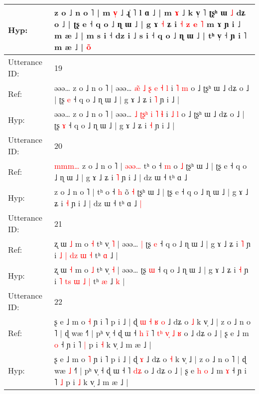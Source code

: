 \documentclass[10pt]{article}
\DeclareRobustCommand{\hl}[1]{{\textcolor{red}{#1}}}
\begin{document}
\begin{longtable}{ll}
 \\
Hyp: & z o ˩ n o ˥ | m \hl{v}\hl{̩} ˩ ɻ̍ ˥ l ɑ ˩ | m \hl{ɤ} ˩ k v̩ ˥\hl{}\hl{} ʈʂʰ ɯ \hl{˩} dʑ o ˩ | ʈʂ e ˧ q o ˩ ɳ ɯ ˩ | g ɤ \hl{˧} ʑ i\hl{}\hl{} \hl{˧} \hl{}\hl{z} \hl{e} \hl{˥} m ɤ\hl{}\hl{} ɲ i ˩ m æ ˩ | \hl{}\hl{}m\hl{} s i ˧ dz i ˩\hl{}\hl{} s i ˧ q o ˩ ɳ ɯ ˩ | tʰ v̩ ˧ ɲ i ˥ m æ ˩ | \hl{o}̃\hl{}\hl{}\hl{}\hl{}
 \\
\midrule
Utterance ID: & 19 \\
Ref: & əəə… z o ˩ n o ˥ | əəə… \hl{æ}\hl{̃} \hl{˩}\hl{ }\hl{ʂ} \hl{e} \hl{˧} \hl{l} i \hl{˥} \hl{m} o ˩ ʈʂʰ ɯ ˩ dʑ o ˩ | ʈʂ \hl{e} ˧ q o ˩ ɳ ɯ ˩ | g ɤ ˩ ʑ i \hl{˥} ɲ i ˩ |
 \\
Hyp: & əəə… z o ˩ n o ˥ | əəə… \hl{}\hl{˩} \hl{ʈ}\hl{ʂ}\hl{ʰ} \hl{i} \hl{˥} \hl{ɬ} i \hl{˩} \hl{l} o ˩ ʈʂʰ ɯ ˩ dʑ o ˩ | ʈʂ \hl{ɤ} ˧ q o ˩ ɳ ɯ ˩ | g ɤ ˩ ʑ i \hl{˧} ɲ i ˩ |
 \\
\midrule
Utterance ID: & 20 \\
Ref: & \hl{m}\hl{m}\hl{m}\hl{…}\hl{ }z o ˩ n o ˥ |\hl{ }\hl{ə}\hl{ə}\hl{ə}\hl{…} tʰ o ˧ \hl{m} o\hl{} \hl{˩} ʈʂʰ ɯ ˩ | ʈʂ e ˧ q o ˩ ɳ ɯ ˩ | g ɤ ˩ ʑ i \hl{˥} ɲ i ˩ | dz ɯ ˧ tʰ ɑ ˩\hl{}\hl{}
 \\
Hyp: & \hl{}\hl{}\hl{}\hl{}\hl{}z o ˩ n o ˥ |\hl{}\hl{}\hl{}\hl{}\hl{} tʰ o ˧ \hl{h} o\hl{̃} \hl{˧} ʈʂʰ ɯ ˩ | ʈʂ e ˧ q o ˩ ɳ ɯ ˩ | g ɤ ˩ ʑ i \hl{˧} ɲ i ˩ | dz ɯ ˧ tʰ ɑ ˩\hl{ }\hl{|}
 \\
\midrule
Utterance ID: & 21 \\
Ref: & ʐ ɯ \hl{˩} m o \hl{˧} tʰ v̩ \hl{˥} | əəə…\hl{ }\hl{|} ʈʂ \hl{e} ˧ q o ˩ ɳ ɯ ˩ | g ɤ ˩ ʑ i \hl{˥} ɲ i \hl{˩} \hl{|}\hl{ }\hl{d}\hl{z} \hl{ɯ} \hl{˧} tʰ \hl{ɑ} ˩\hl{}\hl{} |
 \\
Hyp: & ʐ ɯ \hl{˧} m o \hl{˩} tʰ v̩ \hl{˧} | əəə…\hl{}\hl{} ʈʂ \hl{ɯ} ˧ q o ˩ ɳ ɯ ˩ | g ɤ ˩ ʑ i \hl{˧} ɲ i \hl{˥} \hl{t}\hl{s}\hl{ }\hl{ɯ} \hl{˩} \hl{|} tʰ \hl{æ} ˩\hl{ }\hl{k} |
 \\
\midrule
Utterance ID: & 22 \\
Ref: & ʂ e ˩ m o \hl{˧} ɲ i ˥ p i ˩ | ɖ\hl{ }\hl{ɯ}\hl{ }\hl{˧}\hl{ }\hl{ʁ} \hl{o} ˩ dʑ o \hl{˩} k v̩ ˩ | z o ˩ n o ˥ | ɖ wæ\hl{}\hl{} ˧˥ | pʰ v̩ ˧ ɖ ɯ ˧\hl{ }\hl{h}\hl{ }\hl{i}\hl{̃} ˥\hl{ }\hl{t}\hl{ʰ}\hl{ }\hl{v}\hl{̩} \hl{˩}\hl{ }\hl{ʁ} o ˩ dʑ o ˩ | ʂ e\hl{}\hl{}\hl{}\hl{} ˩ m \hl{o} ˧ ɲ i ˥ \hl{|} p i \hl{˧} k v̩ ˩ m æ ˩ |
 \\
Hyp: & ʂ e ˩ m o \hl{˥} ɲ i ˥ p i ˩ | ɖ\hl{}\hl{}\hl{}\hl{}\hl{}\hl{} \hl{ɤ} ˩ dʑ o \hl{˧} k v̩ ˩ | z o ˩ n o ˥ | ɖ wæ\hl{ }\hl{˩} ˧˥ | pʰ v̩ ˧ ɖ ɯ ˧\hl{}\hl{}\hl{}\hl{}\hl{} ˥\hl{}\hl{}\hl{}\hl{}\hl{}\hl{} \hl{}\hl{d}\hl{ʑ} o ˩ dʑ o ˩ | ʂ e\hl{ }\hl{h}\hl{ }\hl{o} ˩ m \hl{ɤ} ˧ ɲ i ˥ \hl{˩} p i \hl{˩} k v̩ ˩ m æ ˩ |

\end{longtable}
\end{document}

